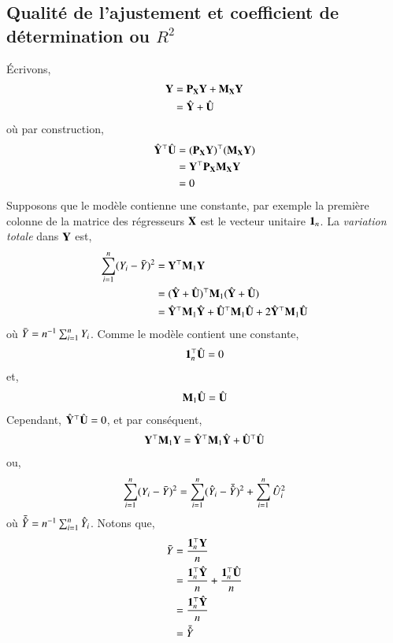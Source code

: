 \documentclass[10pt, reqno]{amsart}
\begin{document}
\subsection{Qualité de l'ajustement et coefficient de détermination ou $R^2$}
\'Ecrivons,
\begin{align*}
\mathbf Y &= \mathbf P_\mathbf X\mathbf Y+ \mathbf M_\mathbf X\mathbf Y\\
&=\hat{\mathbf Y}+\hat{\mathbf U}
\end{align*}
où par construction,
\begin{align*}
\hat{\mathbf Y}^\top\hat{\mathbf U} &= (\mathbf P_\mathbf X\mathbf Y)^\top (\mathbf M_\mathbf X\mathbf Y)\\ 
&= \mathbf Y^\top  \mathbf P_\mathbf X \mathbf M_\mathbf X\mathbf Y\\
& = 0
\end{align*}
Supposons que le modèle contienne une constante, par exemple la première colonne de la matrice des régresseurs $\mathbf X$ est le vecteur unitaire $\mathbf{1}_n$. La \emph{variation totale} dans $\mathbf Y$ est,
\begin{align*}
\sum_{i=1}^n(Y_i - \bar{Y})^2 &= \mathbf Y^\top\mathbf M_1\mathbf Y\\
&=(\hat{\mathbf Y}  + \hat{\mathbf U} )^\top\mathbf M_1(\hat{\mathbf Y}  + \hat{\mathbf U} )\\
&=\hat{\mathbf Y}^\top\mathbf M_1\hat{\mathbf Y} + \hat{\mathbf U}^\top\mathbf M_1\hat{\mathbf U} + 2\hat{\mathbf Y}^\top\mathbf M_1\hat{\mathbf U}
\end{align*}
où $\bar{Y} = n^{-1}\sum_{i=1}^n Y_i$. Comme le modèle contient une constante,
\begin{align*}
\mathbf{1}_n^\top\hat{\mathbf U} = 0
\end{align*}
et,
\begin{align*}
\mathbf M_1\hat{\mathbf U} =\hat{\mathbf U}  
\end{align*}
Cependant, $\hat{\mathbf Y}^\top \hat{\mathbf U} =0$, et par conséquent,
\begin{align*}
\mathbf Y^\top\mathbf M_1\mathbf Y = \hat{\mathbf Y}^\top\mathbf M_1\hat{\mathbf Y} +
\hat{\mathbf U}^\top\hat{\mathbf U} 
\end{align*}
ou,
\begin{align*}
\sum_{i=1}^n(Y_i-\bar{Y})^2 = \sum_{i=1}^n(\hat{Y}_i - \bar{\hat{Y}})^2 + \sum_{i=1}^n \hat{U}_i^2
\end{align*}
où $\bar{\hat{Y}} = n^{-1}\sum_{i=1}^n \hat{Y}_i$. Notons que,
\begin{align*}
\bar{Y} &= \frac{\mathbf{1}_n^\top\mathbf Y}{n} \\
&= \frac{\mathbf{1}_n^\top\hat{\mathbf Y}}{n}
+ \frac{\mathbf{1}_n^\top\hat{\mathbf U}}{n}\\
& = \frac{\mathbf{1}_n^\top\hat{\mathbf Y}}{n} \\
&= \bar{\hat{Y}}
\end{align*}
\end{document}
